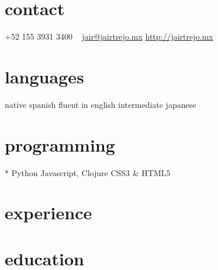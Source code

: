 \documentclass[]{friggeri-cv} %
\begin{document}


\begin{aside} %
\section{contact}
+52 155 3931 3400
~
\href{mailto:jair@jairtrejo.mx}{jair@jairtrejo.mx}
\href{http://jairtrejo.mx}{http://jairtrejo.mx}
\section{languages}
native spanish
fluent in english
intermediate japanese
\section{programming}
{\color{red} $\ast$} Python
Javascript, Clojure
CSS3 \& HTML5
\end{aside}


\section{experience}

\begin{entrylist}

\end{entrylist}


\section{education}

\begin{entrylist}

\end{entrylist}
\end{document}
